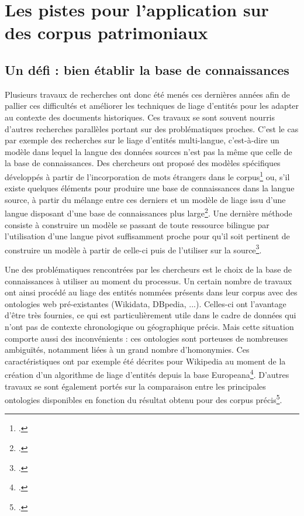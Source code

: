 \documentclass[a4paper,12pt,twoside]{book}
\begin{document}
	\section{Les pistes pour l'application sur des corpus patrimoniaux}
	
	\subsection{Un défi : bien établir la base de connaissances}
	
	Plusieurs travaux de recherches ont donc été menés ces dernières années afin de pallier ces difficultés et améliorer les techniques de liage d'entités pour les adapter au contexte des documents historiques. Ces travaux se sont souvent nourris d'autres recherches parallèles portant sur des problématiques proches. C'est le cas par exemple des recherches sur le liage d'entités multi-langue, c'est-à-dire un modèle dans lequel la langue des données sources n'est pas la même que celle de la base de connaissances. Des chercheurs ont proposé des modèles spécifiques développés à partir de l'incorporation de mots étrangers dans le corpus\footcite{linhares_pontes_linking_2020} ou, s'il existe quelques éléments pour produire une base de connaissances dans la langue source, à partir du mélange entre ces derniers et un modèle de liage issu d'une langue disposant d'une base de connaissances plus large\footcite{zhou_towards_2019}. Une dernière méthode consiste à construire un modèle se passant de toute ressource bilingue par l'utilisation d'une langue pivot suffisamment proche pour qu'il soit pertinent de construire un modèle à partir de celle-ci puis de l'utiliser sur la source\footcite{rijhwani_zero-shot_2019}.
	
	Une des problématiques rencontrées par les chercheurs est le choix de la base de connaissances à utiliser au moment du processus. Un certain nombre de travaux ont ainsi procédé au liage des entités nommées présents dans leur corpus avec des ontologies web pré-existantes (Wikidata, DBpedia, ...). Celles-ci ont l'avantage d'être très fournies, ce qui est particulièrement utile dans le cadre de données qui n'ont pas de contexte chronologique ou géographique précis. Mais cette situation comporte aussi des inconvénients : ces ontologies sont porteuses de nombreuses ambiguïtés, notamment liées à un grand nombre d'homonymies. Ces caractéristiques ont par exemple été décrites pour Wikipedia au moment de la création d'un algorithme de liage d'entités depuis la base Europeana\footcite{agirre_matching_2012}. D'autres travaux se sont également portés sur la comparaison entre les principales ontologies disponibles en fonction du résultat obtenu pour des corpus précis\footcite{soudani_adaptation_2018}.
	
\end{document}
